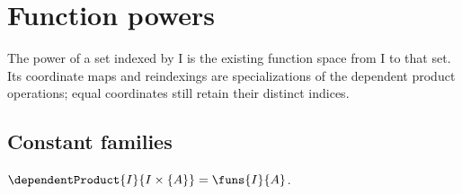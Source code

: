 \section{Function powers}




The power of a set indexed by I is the existing function space from I to that
set. Its coordinate maps and reindexings are specializations of the dependent
product operations; equal coordinates still retain their distinct indices.

\subsection{Constant families}

\begin{theorem}\label{constant_family_dependent_product}
    $\dependentProduct{I}{I\times\{A\}}=\funs{I}{A}$.
\end{theorem}

